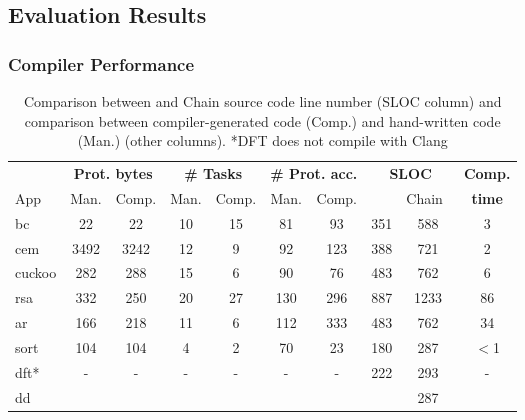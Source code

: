 \subsection{\sys Evaluation Results}
\label{sec:results_evaluation}

\subsubsection{\sys Compiler Performance}
\label{sec:results_compiler}

\begin{table}[t]
	\centering
	\footnotesize
        \renewcommand{\tabcolsep}{1pt}
	\begin{tabular}{|l|cc|cc|cc|cc|c|}
		\hline
		{} & \multicolumn{2}{c|}{{\bf Prot. bytes}} & \multicolumn{2}{c|}{{\bf \# Tasks}} & \multicolumn{2}{c|}{{\bf \# Prot. acc.}} & \multicolumn{2}{c|}{\bf SLOC} & {\bf Comp.} \\
		App & Man. & Comp. & Man. & Comp. & Man. & Comp. & \multicolumn{1}{l}{\sys} & \multicolumn{1}{r|}{Chain~\cite{chain}} & {\bf time} \\
		\hline\hline
		bc & 22 & 22 & 10 & 15 & 81 & 93 & 351 &588 & 3\\
		cem & 3492 & 3242 & 12 & 9 & 92 & 123 & 388 &721 & 2\\
		cuckoo & 282 & 288 & 15 & 6 & 90 & 76 & 483 &762 & 6\\
		rsa & 332 & 250 & 20 & 27 & 130 & 296 & 887 &1233 & 86\\
		ar & 166 & 218 & 11 & 6 & 112 & 333 & 483 &762 & 34\\
		sort & 104 & 104 & 4 & 2 & 70 & 23 & 180 & 287 & $<$1\\
		dft* & - & - & - & - & - & - & 222 & 293 & -\\
		dd &  &  &  &  &  &  &  & 287 &  \\
		\hline
	\end{tabular}
	\caption{Comparison between \sys and Chain source code line number (SLOC column) and comparison between compiler-generated \sys code (Comp.) and hand-written \sys code (Man.) (other columns). *DFT does not compile with Clang}
\label{table:compiler_result}
\end{table}

